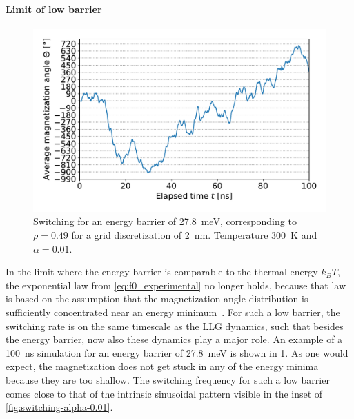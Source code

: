 \documentclass[11pt,a4paper,english,twoside]{article}
\begin{document}
\paragraph{Limit of low barrier}
\begin{figure}
    \centering
    \includegraphics[width=0.8\columnwidth]{Figures/biaxial_island/Switching/49x100_300K_alpha0.01_100ns_2nm.pdf}
    \caption{Switching for an energy barrier of \SI{27.8}{\milli\electronvolt}, corresponding to $\rho=0.49$ for a grid discretization of \SI{2}{\nano\metre}. Temperature \SI{300}{\kelvin} and $\alpha = 0.01$.}
    \label{fig:switching-49x100-300}
\end{figure}
In the limit where the energy barrier is comparable to the thermal energy $k_B T$, the exponential law from \cref{eq:f0_experimental} no longer holds, because that law is based on the assumption that the magnetization angle distribution is sufficiently concentrated near an energy minimum~\cite{ThermFluc_SingleDomain}.
For such a low barrier, the switching rate is on the same timescale as the LLG dynamics, such that besides the energy barrier, now also these dynamics play a major role. An example of a \SI{100}{\nano\second} simulation for an energy barrier of \SI{27.8}{\milli\electronvolt} is shown in \cref{fig:switching-49x100-300}. As one would expect, the magnetization does not get stuck in any of the energy minima because they are too shallow. The switching frequency for such a low barrier comes close to that of the intrinsic sinusoidal pattern visible in the inset of \cref{fig:switching-alpha-0.01}.


\cleardoublepage
\end{document}
